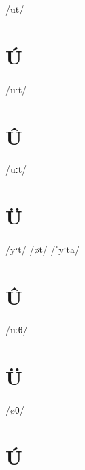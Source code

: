 \documentclass[10pt,a4paper,twoside]{book}
\begin{document}
\begin{multicols}{3}
 {/ut/} {}
\end{multicols}

\section*{Ú}

\begin{multicols}{3}
 {/uˑt/} {}
\end{multicols}

\section*{Û}

\begin{multicols}{3}
 {/uːt/} {}
\end{multicols}

\section*{Ü}

\begin{multicols}{3}
 {/yˑt/} {}
 {/øt/} {}
 {/ˈyˑta/} {}
\end{multicols}

\section*{Û}

\begin{multicols}{3}
 {/uːθ/} {}
\end{multicols}

\section*{Ü}

\begin{multicols}{3}
 {/øθ/} {}
\end{multicols}

\section*{Ú}
\end{document}
